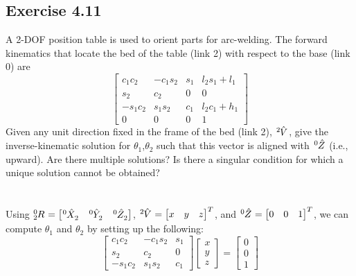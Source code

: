 \documentclass[10pt]{article}
\begin{document}
\subsection*{Exercise 4.11}
A 2-DOF position table is used to orient parts for arc-welding.  The forward kinematics
that locate the bed of the table (link 2) with respect to the base (link 0) are
\[
\begin{bmatrix}
    c_{1} c_{2}  & -c_{1} s_{2} & s_{1} & l_{2} s_{1} + l_{1} \\
    s_{2}        & c_{2}        & 0     & 0 \\
    -s_{1} c_{2} & s_{1} s_{2}  & c_{1} & l_{2} c_{1} + h_{1} \\
    0            & 0            & 0     & 1
\end{bmatrix}
\]
Given any unit direction fixed in the frame of the bed (link 2), $\tensor*[^{2}]{\hat{V}}{}$, give the inverse-kinematic solution for $\theta_{1}$,$\theta_{2}$ such that this vector is aligned with $\tensor*[^{0}]{\hat{Z}}{}$ (i.e., upward). Are there multiple solutions? Is there a singular condition for which a unique solution cannot be obtained?
\\ \\ \\
Using $
\tensor*[^{0}_{2}]{R}{} =
\begin{bmatrix}
\tensor*[^{0}]{\hat{X}}{_{2}} &
\tensor*[^{0}]{\hat{Y}}{_{2}} &
\tensor*[^{0}]{\hat{Z}}{_{2}}
\end{bmatrix}$,
$\tensor*[^{2}]{\hat{V}}{} = 
\begin{bmatrix}
x & y & z
\end{bmatrix}^T$, and 
$
\tensor*[^{0}]{\hat{Z}}{} =
\begin{bmatrix}
0 & 0 & 1
\end{bmatrix}^T$, we can compute $\theta_{1}$ and $\theta_{2}$ by setting up the following: \\
\[
\begin{bmatrix}
    c_{1} c_{2}  & -c_{1} s_{2} & s_{1} \\
    s_{2}        & c_{2}        & 0     \\
    -s_{1} c_{2} & s_{1} s_{2}  & c_{1} 
\end{bmatrix}
\begin{bmatrix}
x \\ y \\ z
\end{bmatrix} =
\begin{bmatrix}
0 \\ 0 \\ 1
\end{bmatrix}
\]
\end{document}
